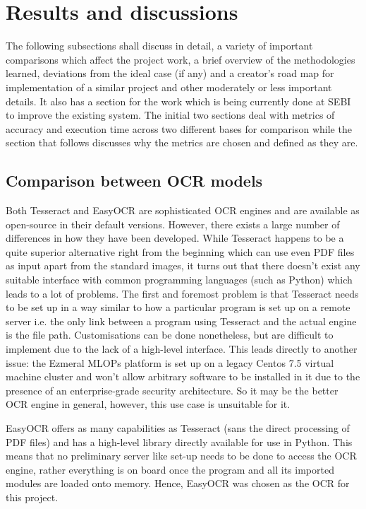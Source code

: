 \chapter{Results and discussions} \label{chapter5}

The following subsections shall discuss in detail, a variety of important comparisons which affect the project work, a brief overview of the methodologies learned, deviations from the ideal case (if any) and a creator’s road map for implementation of a similar project and other moderately or less important details. It also has a section for the work which is being currently done at SEBI to improve the existing system. The initial two sections deal with metrics of accuracy and execution time across two different bases for comparison while the section that follows discusses why the metrics are chosen and defined as they are. \par

\section{Comparison between OCR models}

Both Tesseract and EasyOCR are sophisticated OCR engines and are available as open-source in their default versions. However, there exists a large number of differences in how they have been developed. While Tesseract \cite{Google2015} happens to be a quite superior alternative right from the beginning which can use even PDF files as input apart from the standard images, it turns out that there doesn’t exist any suitable interface with common programming languages (such as Python) which leads to a lot of problems. The first and foremost problem is that Tesseract needs to be set up in a way similar to how a particular program is set up on a remote server i.e. the only link between a program using Tesseract and the actual engine is the file path. Customisations can be done nonetheless, but are difficult to implement due to the lack of a high-level interface. This leads directly to another issue: the Ezmeral MLOPs platform is set up on a legacy Centos 7.5 virtual machine cluster and won’t allow arbitrary software to be installed in it due to the presence of an enterprise-grade security architecture.  So it may be the better OCR engine in general, however, this use case is unsuitable for it.\par

EasyOCR offers as many capabilities \cite{Jaided2020} as Tesseract (sans the direct processing of PDF files) and has a high-level library directly available for use in Python. This means that no preliminary server like set-up needs to be done to access the OCR engine, rather everything is on board once the program and all its imported modules are loaded onto memory. Hence, EasyOCR was chosen as the OCR for this project. \par

